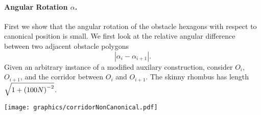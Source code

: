 \paragraph{Angular Rotation $\alpha$.}
First we show that the angular rotation of the obstacle hexagons with respect to canonical position is small.  
We first look at the relative angular difference between two adjacent obstacle polygons
$$\left\vert \alpha_i - \alpha_{i+1} \right\vert.$$
Given an arbitrary instance of a modified auxilary construction, consider $O_i$, $O_{i+1}$, and the corridor between $O_i$ and $O_{i+1}$.
The skinny rhombus  has length $\sqrt{1 + \left( 100N \right)^{-2}}$.

\begin{minipage}{\linewidth}
\begin{center}
\texttt{[image: graphics/corridorNonCanonical.pdf]}
\label{fig:corridorNonCanonical.pdf}
\end{center}
\end{minipage}

